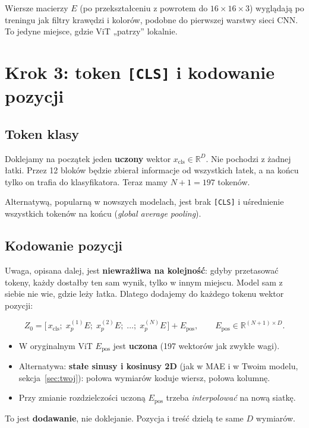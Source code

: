 \documentclass[11pt,a4paper]{article}
\begin{document}
\begin{intuicja}
Wiersze macierzy $E$ (po przekształceniu z powrotem do $16\times16\times3$) wyglądają po treningu
jak filtry krawędzi i kolorów, podobne do pierwszej warstwy sieci CNN. To jedyne miejsce, gdzie ViT
„patrzy'' lokalnie.
\end{intuicja}

\section{Krok 3: token \texttt{[CLS]} i kodowanie pozycji}

\subsection{Token klasy}
Doklejamy na początek jeden \textbf{uczony} wektor $x_{\text{cls}}\in\mathbb{R}^{D}$. Nie pochodzi z
żadnej łatki. Przez 12 bloków będzie zbierał informacje od wszystkich łatek, a na końcu tylko on
trafia do klasyfikatora. Teraz mamy $N+1=197$ tokenów.

Alternatywą, popularną w nowszych modelach, jest brak \texttt{[CLS]} i uśrednienie wszystkich
tokenów na końcu (\emph{global average pooling}).

\subsection{Kodowanie pozycji}
Uwaga, opisana dalej, jest \textbf{niewrażliwa na kolejność}: gdyby przetasować tokeny, każdy dostałby
ten sam wynik, tylko w innym miejscu. Model sam z siebie nie wie, gdzie leży łatka. Dlatego dodajemy
do każdego tokenu wektor pozycji:
\begin{wzor}
\[
Z_0=\big[\,x_{\text{cls}};\; x_p^{(1)}E;\; x_p^{(2)}E;\;\dots;\; x_p^{(N)}E\,\big]+E_{\text{pos}},
\qquad E_{\text{pos}}\in\mathbb{R}^{(N+1)\times D}.
\]
\end{wzor}
\begin{itemize}[itemsep=1pt]
  \item W oryginalnym ViT $E_{\text{pos}}$ jest \textbf{uczona} (197 wektorów jak zwykłe wagi).
  \item Alternatywa: \textbf{stałe sinusy i kosinusy 2D} (jak w MAE i w Twoim modelu, sekcja~\ref{sec:twoj}): połowa wymiarów koduje wiersz, połowa kolumnę.
  \item Przy zmianie rozdzielczości uczoną $E_{\text{pos}}$ trzeba \emph{interpolować} na nową siatkę.
\end{itemize}
To jest \textbf{dodawanie}, nie doklejanie. Pozycja i treść dzielą te same $D$ wymiarów.
\end{document}
